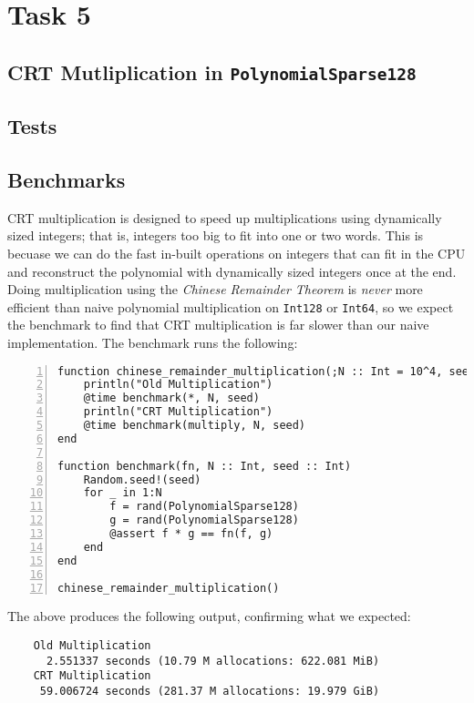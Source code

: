 \documentclass{article}
\theoremstyle{plain}
\numberwithin{theorem}{section}
\numberwithin{example}{section}
\theoremstyle{definition}
\numberwithin{definition}{section}
\begin{document}
\bigbreak

\section{Task 5} \label{crt}
\subsection{CRT Mutliplication in \texttt{PolynomialSparse128}}

\bigbreak

\subsection{Tests}

\bigbreak

\subsection{Benchmarks}
CRT multiplication is designed to speed up multiplications using dynamically
sized integers; that is, integers too big to fit into one or two words. This is
becuase we can do the fast in-built operations on integers that can fit in the
CPU and reconstruct the polynomial with dynamically sized integers once at the
end. Doing multiplication using the \emph{Chinese Remainder Theorem} is
\emph{never} more efficient than naive polynomial multiplication on
\texttt{Int128} or \texttt{Int64}, so we expect the benchmark to find that CRT
multiplication is far slower than our naive implementation. The benchmark runs
the following:

\begin{codebox}
    \begin{Verbatim}[numbers=left,xleftmargin=5mm]
function chinese_remainder_multiplication(;N :: Int = 10^4, seed :: Int = 0)
    println("Old Multiplication")
    @time benchmark(*, N, seed)
    println("CRT Multiplication")
    @time benchmark(multiply, N, seed)
end

function benchmark(fn, N :: Int, seed :: Int)
    Random.seed!(seed)
    for _ in 1:N
        f = rand(PolynomialSparse128)
        g = rand(PolynomialSparse128)
        @assert f * g == fn(f, g)
    end
end

chinese_remainder_multiplication()
    \end{Verbatim}
\end{codebox}

The above produces the following output, confirming what we expected:

\begin{Verbatim}
    Old Multiplication
      2.551337 seconds (10.79 M allocations: 622.081 MiB)
    CRT Multiplication
     59.006724 seconds (281.37 M allocations: 19.979 GiB)
\end{Verbatim}
\end{document}
